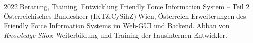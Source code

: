 \cventry
{2022}
{Beratung, Training, Entwicklung}
{Friendly Force Information System -- Teil 2}
{Österreichisches Bundesheer (IKT\&CySihZ)}
{Wien, Österreich}
{
  Erweiterungen des Friendly Force Information Systems im Web-GUI und Backend.
  Abbau von \emph{Knowledge Silos}: Weiterbildung und Training der
  hausinternen Entwickler.
}
